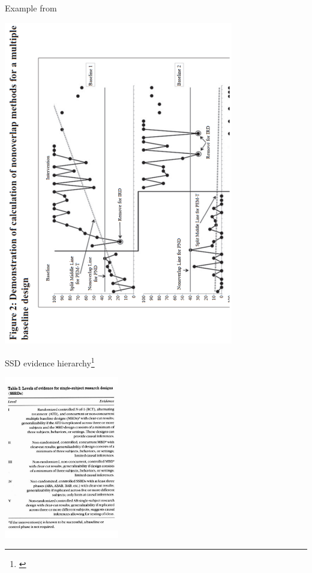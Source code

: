 \documentclass{beamer}
\begin{document}
%
\begin{frame}{Example from \citet{Rakap2015}}
	\begin{center}
	\includegraphics[angle=270, width=10cm]{images/Rakap_Fig2.pdf}
	\end{center}
\end{frame}

% 
\begin{frame}{SSD evidence hierarchy\footnote{\tiny{\citet[p.100]{Logan2008}}}}
	\begin{center}
	\includegraphics[width=5cm]{images/Logan2008_table1.pdf}
	\end{center}
\end{frame}
\end{document}
